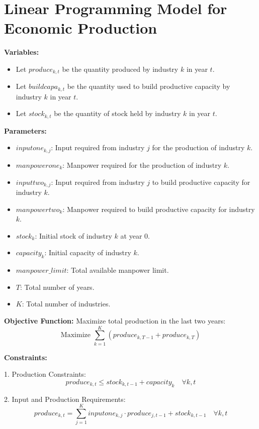 \documentclass{article}
\begin{document}
\section*{Linear Programming Model for Economic Production}

\textbf{Variables:}
\begin{itemize}
    \item Let \( produce_{k, t} \) be the quantity produced by industry \( k \) in year \( t \).
    \item Let \( buildcapa_{k, t} \) be the quantity used to build productive capacity by industry \( k \) in year \( t \).
    \item Let \( stock_{k, t} \) be the quantity of stock held by industry \( k \) in year \( t \).
\end{itemize}

\textbf{Parameters:}
\begin{itemize}
    \item \( inputone_{k, j} \): Input required from industry \( j \) for the production of industry \( k \).
    \item \( manpowerone_{k} \): Manpower required for the production of industry \( k \).
    \item \( inputtwo_{k, j} \): Input required from industry \( j \) to build productive capacity for industry \( k \).
    \item \( manpowertwo_{k} \): Manpower required to build productive capacity for industry \( k \).
    \item \( stock_{k} \): Initial stock of industry \( k \) at year 0.
    \item \( capacity_{k} \): Initial capacity of industry \( k \).
    \item \( manpower\_limit \): Total available manpower limit.
    \item \( T \): Total number of years.
    \item \( K \): Total number of industries.
\end{itemize}

\textbf{Objective Function:}
Maximize total production in the last two years:
\[
\text{Maximize } \sum_{k=1}^{K} (produce_{k, T-1} + produce_{k, T})
\]

\textbf{Constraints:}

1. Production Constraints:
\[
produce_{k, t} \leq stock_{k, t-1} + capacity_{k} \quad \forall k, t
\]

2. Input and Production Requirements:
\[
produce_{k, t} = \sum_{j=1}^{K} inputone_{k,j} \cdot produce_{j, t-1} + stock_{k, t-1} \quad \forall k, t
\]
\end{document}
